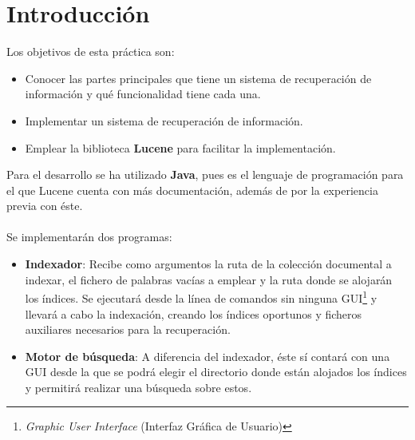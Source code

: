 	
	
	
\setcounter{page}{0}

\maketitle %
\thispagestyle{empty}

\newpage %

\tableofcontents %

\newpage %

\listoffigures

\listoftables

\newpage


\section{Introducción}
\label{sec:intro}

Los objetivos de esta práctica son:

\begin{itemize}
	\item Conocer las partes principales que tiene un sistema de recuperación de información y qué funcionalidad tiene cada una.
	\item Implementar un sistema de recuperación de información.
	\item Emplear la biblioteca \textbf{Lucene} para facilitar la implementación.
\end{itemize}

Para el desarrollo se ha utilizado \textbf{Java}, pues es el lenguaje de programación para el que Lucene cuenta con más documentación, además de por la experiencia previa con éste.
\\ \\
Se implementarán dos programas:

\begin{itemize}
	\item \textbf{Indexador}: Recibe como argumentos la ruta de la colección documental a indexar, el fichero de palabras vacías a emplear y la ruta donde se alojarán los índices. Se ejecutará desde la línea de comandos sin ninguna GUI\footnote{\textit{Graphic User Interface} (Interfaz Gráfica de Usuario)} y llevará a cabo la indexación, creando los índices oportunos y ficheros auxiliares necesarios para la recuperación.
	\item \textbf{Motor de búsqueda}: A diferencia del indexador, éste sí contará con una GUI desde la que se podrá elegir el directorio donde están alojados los índices y permitirá realizar una búsqueda sobre estos.
\end{itemize}

